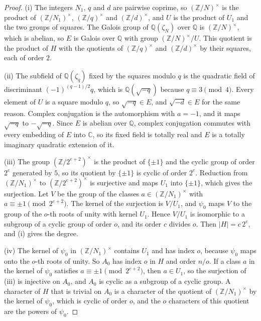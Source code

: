 \begin{proof}
(i) The integers $N_1$, $q$ and $d$ are pairwise coprime, so $(\mathbb Z/N)^\times$ is the product of $(\mathbb Z/N_1)^\times$, $(\mathbb Z/q)^\times$ and $(\mathbb Z/d)^\times$, and $U$ is the product of $U_1$ and the two groups of squares. The Galois group of $\mathbb Q(\zeta_N)$ over $\mathbb Q$ is $(\mathbb Z/N)^\times$, which is abelian, so $E$ is Galois over $\mathbb Q$ with group $(\mathbb Z/N)^\times/U$. This quotient is the product of $H$ with the quotients of $(\mathbb Z/q)^\times$ and $(\mathbb Z/d)^\times$ by their squares, each of order $2$.

(ii) The subfield of $\mathbb Q(\zeta_q)$ fixed by the squares modulo $q$ is the quadratic field of discriminant $(-1)^{(q-1)/2}q$, which is $\mathbb Q(\sqrt{-q})$ because $q\equiv3\pmod4$. Every element of $U$ is a square modulo $q$, so $\sqrt{-q}\in E$, and $\sqrt{-d}\in E$ for the same reason. Complex conjugation is the automorphism with $a=-1$, and it maps $\sqrt{-q}$ to $-\sqrt{-q}$. Since $E$ is abelian over $\mathbb Q$, complex conjugation commutes with every embedding of $E$ into $\mathbb C$, so its fixed field is totally real and $E$ is a totally imaginary quadratic extension of it.

(iii) The group $(\mathbb Z/2^{e+2})^\times$ is the product of $\{\pm1\}$ and the cyclic group of order $2^e$ generated by $5$, so its quotient by $\{\pm1\}$ is cyclic of order $2^e$. Reduction from $(\mathbb Z/N_1)^\times$ to $(\mathbb Z/2^{e+2})^\times$ is surjective and maps $U_1$ into $\{\pm1\}$, which gives the surjection. Let $V$ be the group of the classes $a\in(\mathbb Z/N_1)^\times$ with $a\equiv\pm1\pmod{2^{e+2}}$. The kernel of the surjection is $V/U_1$, and $\psi_0$ maps $V$ to the group of the $o$-th roots of unity with kernel $U_1$. Hence $V/U_1$ is isomorphic to a subgroup of a cyclic group of order $o$, and its order $c$ divides $o$. Then $\lvert H\rvert=c\,2^e$, and (i) gives the degree.

(iv) The kernel of $\psi_0$ in $(\mathbb Z/N_1)^\times$ contains $U_1$ and has index $o$, because $\psi_0$ maps onto the $o$-th roots of unity. So $A_0$ has index $o$ in $H$ and order $n/o$. If a class $a$ in the kernel of $\psi_0$ satisfies $a\equiv\pm1\pmod{2^{e+2}}$, then $a\in U_1$, so the surjection of (iii) is injective on $A_0$, and $A_0$ is cyclic as a subgroup of a cyclic group. A character of $H$ that is trivial on $A_0$ is a character of the quotient of $(\mathbb Z/N_1)^\times$ by the kernel of $\psi_0$, which is cyclic of order $o$, and the $o$ characters of this quotient are the powers of $\psi_0$.
\end{proof}

